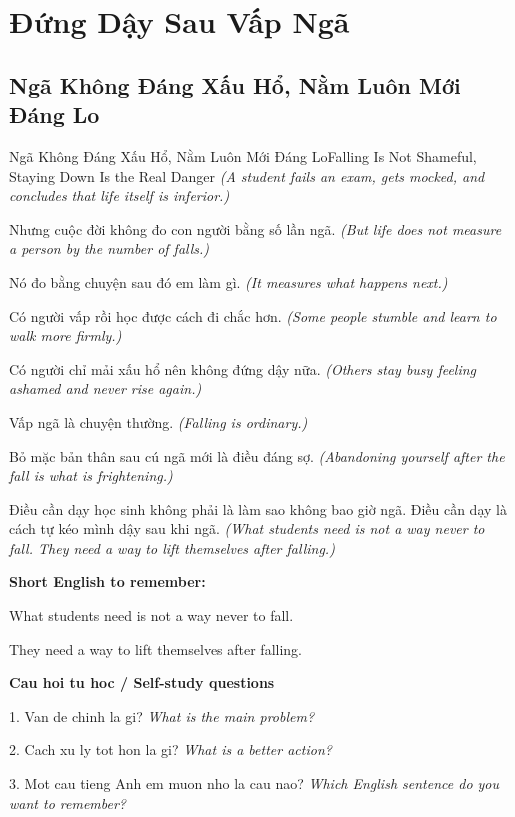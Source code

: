 \chapter{Đứng Dậy Sau Vấp Ngã}

\section{Ngã Không Đáng Xấu Hổ, Nằm Luôn Mới Đáng Lo}
\begin{truyen}{Ngã Không Đáng Xấu Hổ, Nằm Luôn Mới Đáng Lo}{Falling Is Not Shameful, Staying Down Is the Real Danger}
\textit{(A student fails an exam, gets mocked, and concludes that life itself is inferior.)}

Nhưng cuộc đời không đo con người bằng số lần ngã.
\textit{(But life does not measure a person by the number of falls.)}

Nó đo bằng chuyện sau đó em làm gì.
\textit{(It measures what happens next.)}

Có người vấp rồi học được cách đi chắc hơn.
\textit{(Some people stumble and learn to walk more firmly.)}

Có người chỉ mải xấu hổ nên không đứng dậy nữa.
\textit{(Others stay busy feeling ashamed and never rise again.)}

Vấp ngã là chuyện thường.
\textit{(Falling is ordinary.)}

Bỏ mặc bản thân sau cú ngã mới là điều đáng sợ.
\textit{(Abandoning yourself after the fall is what is frightening.)}

\end{truyen}

\begin{baihoc}
Điều cần dạy học sinh không phải là làm sao không bao giờ ngã. Điều cần dạy là cách tự kéo mình dậy sau khi ngã.
\textit{(What students need is not a way never to fall. They need a way to lift themselves after falling.)}
\end{baihoc}

\begin{ghinhoanh}
\textbf{Short English to remember:}

What students need is not a way never to fall.

They need a way to lift themselves after falling.

\end{ghinhoanh}

\begin{tuhocnhanh}
\textbf{Cau hoi tu hoc / Self-study questions}

1. Van de chinh la gi? \textit{What is the main problem?}

2. Cach xu ly tot hon la gi? \textit{What is a better action?}

3. Mot cau tieng Anh em muon nho la cau nao? \textit{Which English sentence do you want to remember?}
\end{tuhocnhanh}
\ngancach

